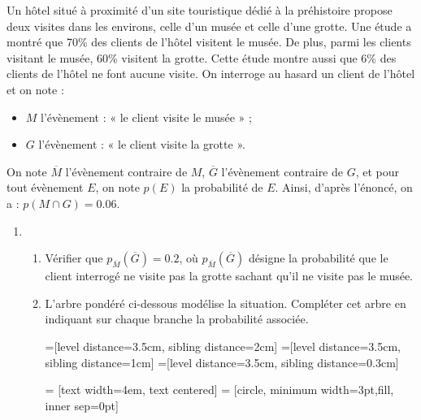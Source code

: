 \documentclass[11pt,fleqn, openany]{book} %
\begin{document}
\begin{exercise}[topic=prob03, subtitle={(Métropole 2022)}] Un hôtel situé à proximité d'un site touristique dédié à la préhistoire propose deux visites dans
les environs, celle d'un musée et celle d'une grotte.
Une étude a montré que 70\% des clients de l'hôtel visitent le musée. De plus, parmi les clients
visitant le musée, 60\% visitent la grotte.
Cette étude montre aussi que 6\% des clients de l'hôtel ne font aucune visite.
On interroge au hasard un client de l'hôtel et on note :
\begin{itemize}
\item $M$ l'évènement : « le client visite le musée » ;
\item $G$ l'évènement : « le client visite la grotte ».\end{itemize}
On note $\overline{M}$ l'évènement contraire de $M$, $\overline{G}$ l'évènement contraire de $G$, et pour tout évènement $E$, on note $p(E)$ la probabilité de $E$. Ainsi, d'après l'énoncé, on a : $p(M\cap G)=0.06$.

\begin{enumerate}\item \begin{enumerate}
\item Vérifier que $p_{\overline{M}}(\overline{G})=0.2$, où $p_{\overline{M}}(\overline{G})$ désigne la probabilité que le client interrogé ne visite pas la grotte sachant qu'il
ne visite pas le musée.
\item L'arbre pondéré ci-dessous modélise la
situation. Compléter cet
arbre en indiquant sur chaque branche
la probabilité associée.

\begin{center}

=[level distance=3.5cm, sibling distance=2cm]
=[level distance=3.5cm, sibling distance=1cm]
=[level distance=3.5cm, sibling distance=0.3cm]

 = [text width=4em, text centered]
 = [circle, minimum width=3pt,fill, inner sep=0pt]

\end{center}


\end{enumerate}
\end{enumerate}
\end{exercise}
\end{document}
